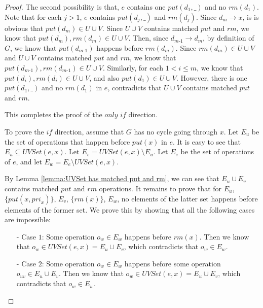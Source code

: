 \begin {proof}
The second possibility is that, $e$ contains one $\textit{put}(d_1,\_)$ and no $\textit{rm}(d_1)$. Note that for each $j > 1$, $e$ contains $\textit{put}(d_j,\_)$ and $\textit{rm}(d_j)$. Since $d_m \rightarrow x$, is is obvious that $\textit{put}(d_m) \in U \cup V$. Since $U \cup V$ contains matched $\textit{put}$ and $\textit{rm}$, we know that $\textit{put}(d_m),\textit{rm}(d_m) \in U \cup V$. Then, since $d_{\textit{m-1}} \rightarrow d_m$, by definition of $G$, we know that $\textit{put}(d_{\textit{m-1}})$ happens before $\textit{rm}(d_m)$. Since $\textit{rm}(d_m) \in U \cup V$ and $U \cup V$ contains matched $\textit{put}$ and $\textit{rm}$, we know that $\textit{put}(d_{\textit{m-1}}),\textit{rm}(d_{\textit{m-1}}) \in U \cup V$. Similarly, for each $1 < i \leq m$, we know that $\textit{put}(d_i),\textit{rm}(d_i) \in U \cup V$, and also $\textit{put}(d_1)\in U \cup V$. However, there is one $\textit{put}(d_1,\_)$ and no $\textit{rm}(d_1)$ in $e$, contradicts that $U \cup V$ contains matched $\textit{put}$ and $\textit{rm}$.

This completes the proof of the $\textit{only if}$ direction.

To prove the $\textit{if}$ direction, assume that $G$ has no cycle going through $x$. Let $E_u$ be the set of operations that happen before $\textit{put}(x)$ in $e$. It is easy to see that $E_u \subseteq \textit{UVSet}(e,x)$. Let $E_v = \textit{UVSet}(e,x) \setminus E_u$. Let $E_e$ be the set of operations of $e$, and let $E_w = E_e \setminus \textit{UVSet}(e,x)$.

By Lemma \ref{lemma:UVSet has matched put and rm}, we can see that $E_u \cup E_v$ contains matched $\textit{put}$ and $\textit{rm}$ operations. It remains to prove that for $E_u$, $\{ \textit{put}(x,\textit{pri}_x) \}$, $E_v$, $\{ \textit{rm}(x) \}$, $E_w$, no elements of the latter set happens before elements of the former set. We prove this by showing that all the following cases are impossible:

\begin{itemize}
\setlength{\itemsep}{0.5pt}
\item[-] Case $1$: Some operation $o_w \in E_w$ happens before $\textit{rm}(x)$. Then we know that $o_w \in \textit{UVSet}(e,x) = E_u \cup E_v$, which contradicts that $o_w \in E_w$.

\item[-] Case $2$: Some operation $o_w \in E_w$ happens before some operation $o_{\textit{uv}} \in E_u \cup E_v$. Then we know that $o_w \in \textit{UVSet}(e,x) = E_u \cup E_v$, which contradicts that $o_w \in E_w$.


\end{itemize}
\end{proof}
